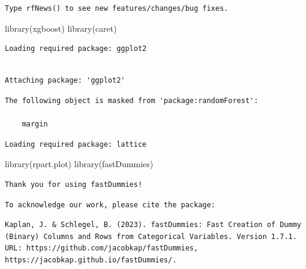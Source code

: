 \documentclass[
  super,
  preprint,
  3p]{elsarticle}
\newenvironment{Shaded}{\begin{snugshade}}{\end{snugshade}}
\newcommand{\FunctionTok}[1]{\textcolor[rgb]{0.28,0.35,0.67}{#1}}
\newcommand{\NormalTok}[1]{\textcolor[rgb]{0.00,0.23,0.31}{#1}}
\begin{document}
\begin{verbatim}
Type rfNews() to see new features/changes/bug fixes.
\end{verbatim}

\begin{Shaded}
\begin{Highlighting}[]
\FunctionTok{library}\NormalTok{(xgboost)}
\FunctionTok{library}\NormalTok{(caret)}
\end{Highlighting}
\end{Shaded}

\begin{verbatim}
Loading required package: ggplot2
\end{verbatim}

\begin{verbatim}

Attaching package: 'ggplot2'
\end{verbatim}

\begin{verbatim}
The following object is masked from 'package:randomForest':

    margin
\end{verbatim}

\begin{verbatim}
Loading required package: lattice
\end{verbatim}

\begin{Shaded}
\begin{Highlighting}[]
\FunctionTok{library}\NormalTok{(rpart.plot)}
\FunctionTok{library}\NormalTok{(fastDummies)}
\end{Highlighting}
\end{Shaded}

\begin{verbatim}
Thank you for using fastDummies!
\end{verbatim}

\begin{verbatim}
To acknowledge our work, please cite the package:
\end{verbatim}

\begin{verbatim}
Kaplan, J. & Schlegel, B. (2023). fastDummies: Fast Creation of Dummy (Binary) Columns and Rows from Categorical Variables. Version 1.7.1. URL: https://github.com/jacobkap/fastDummies, https://jacobkap.github.io/fastDummies/.
\end{verbatim}
\end{document}
